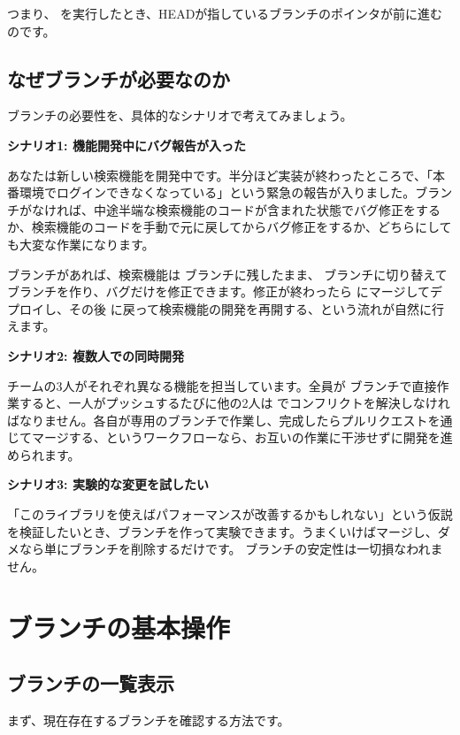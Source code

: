 つまり、 を実行したとき、HEADが指しているブランチのポインタが前に進むのです。

\subsection{なぜブランチが必要なのか}

ブランチの必要性を、具体的なシナリオで考えてみましょう。

\textbf{シナリオ1: 機能開発中にバグ報告が入った}

あなたは新しい検索機能を開発中です。半分ほど実装が終わったところで、「本番環境でログインできなくなっている」という緊急の報告が入りました。ブランチがなければ、中途半端な検索機能のコードが含まれた状態でバグ修正をするか、検索機能のコードを手動で元に戻してからバグ修正をするか、どちらにしても大変な作業になります。

ブランチがあれば、検索機能は  ブランチに残したまま、 ブランチに切り替えて  ブランチを作り、バグだけを修正できます。修正が終わったら  にマージしてデプロイし、その後  に戻って検索機能の開発を再開する、という流れが自然に行えます。

\textbf{シナリオ2: 複数人での同時開発}

チームの3人がそれぞれ異なる機能を担当しています。全員が  ブランチで直接作業すると、一人がプッシュするたびに他の2人は  でコンフリクトを解決しなければなりません。各自が専用のブランチで作業し、完成したらプルリクエストを通じてマージする、というワークフローなら、お互いの作業に干渉せずに開発を進められます。

\textbf{シナリオ3: 実験的な変更を試したい}

「このライブラリを使えばパフォーマンスが改善するかもしれない」という仮説を検証したいとき、ブランチを作って実験できます。うまくいけばマージし、ダメなら単にブランチを削除するだけです。 ブランチの安定性は一切損なわれません。

\section{ブランチの基本操作}

\subsection{ブランチの一覧表示}

まず、現在存在するブランチを確認する方法です。


